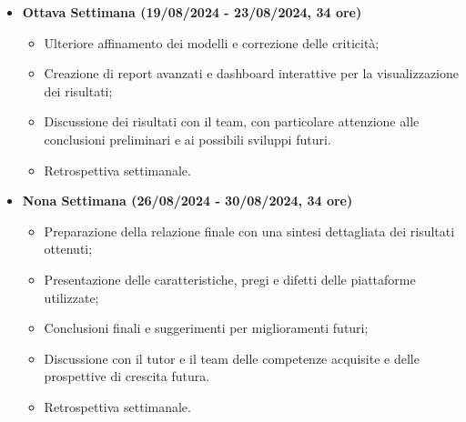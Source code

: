 {\begin{itemize}
    \item \textbf{Ottava Settimana (19/08/2024 - 23/08/2024, 34 ore)}
    \begin{itemize}
        \item Ulteriore affinamento dei modelli e correzione delle criticità;
        \item Creazione di report avanzati e dashboard interattive per la visualizzazione dei risultati;
        \item Discussione dei risultati con il team, con particolare attenzione alle conclusioni preliminari e ai possibili sviluppi futuri.
        \item Retrospettiva settimanale.
    \end{itemize}

    \item \textbf{Nona Settimana (26/08/2024 - 30/08/2024, 34 ore)}
    \begin{itemize}
        \item Preparazione della relazione finale con una sintesi dettagliata dei risultati ottenuti;
        \item Presentazione delle caratteristiche, pregi e difetti delle piattaforme utilizzate;
        \item Conclusioni finali e suggerimenti per miglioramenti futuri;
        \item Discussione con il tutor e il team delle competenze acquisite e delle prospettive di crescita futura.
        \item Retrospettiva settimanale.
    \end{itemize}
\end{itemize}
}

\newcommand{\totaleOre}{306}

